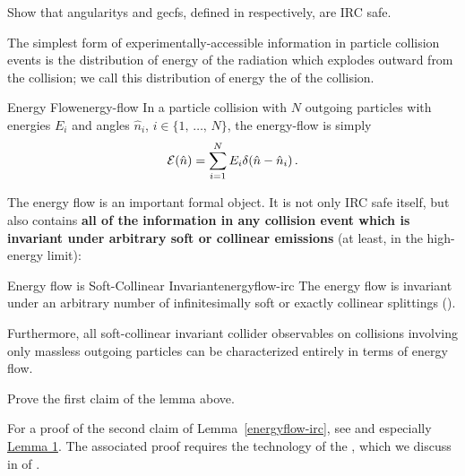 \begin{exercise}{}
    Show that \glspl{angularity} and \glspl{gecf}, defined in  respectively, are IRC safe.
\end{exercise}



The simplest form of experimentally-accessible information in particle collision events is the distribution of energy of the radiation which explodes outward from the collision;
%
we call this distribution of energy the  of the collision.

\begin{definitionbox}{Energy Flow}{energy-flow}
    In a particle collision with \(N\) outgoing particles with energies \(E_i\) and angles \(\hat n_i\), \(i \in \{1,\,\ldots,\,N\}\), the \gls{energy-flow} is simply
    \begin{equation}
      \label{eq:energy-flow}
      \mc E(\hat n) = \sum_{i=1}^N E_i \delta(\hat n - \hat n_i)
      \,.
    \end{equation}

\end{definitionbox}

The energy flow is an important formal object.
%
It is not only IRC safe itself, but also contains \textbf{all of the information in any collision event which is invariant under arbitrary soft or collinear emissions} (at least, in the high-energy limit):

\begin{lemma}{Energy flow is Soft-Collinear Invariant}{energyflow-irc}
    The energy flow is invariant under an arbitrary number of infinitesimally soft or exactly collinear splittings ().

    Furthermore, all soft-collinear invariant collider observables on collisions involving only massless outgoing particles can be characterized entirely in terms of energy flow.
\end{lemma}


\begin{exercise}
    Prove the first claim of the lemma above.
\end{exercise}

For a proof of the second claim of Lemma~\ref{energyflow-irc}, see  and especially \href{https://arxiv.org/pdf/2004.04159\#lemma.1}{Lemma 1}.
%
The associated proof requires the technology of the , which we discuss in  of .



